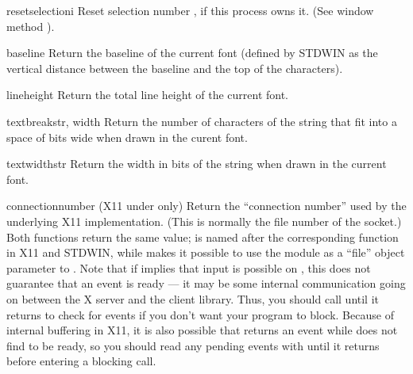 \begin{funcdesc}{resetselection}{i}
Reset selection number , if this process owns it.  (See window
method ).
\end{funcdesc}

\begin{funcdesc}{baseline}{}
Return the baseline of the current font (defined by STDWIN as the
vertical distance between the baseline and the top of the
characters).
\end{funcdesc}

\begin{funcdesc}{lineheight}{}
Return the total line height of the current font.
\end{funcdesc}

\begin{funcdesc}{textbreak}{str, width}
Return the number of characters of the string that fit into a space of
bits wide when drawn in the curent font.
\end{funcdesc}

\begin{funcdesc}{textwidth}{str}
Return the width in bits of the string when drawn in the current font.
\end{funcdesc}

\begin{funcdesc}{connectionnumber}{}
(X11 under \UNIX{} only) Return the ``connection number'' used by the
underlying X11 implementation.  (This is normally the file number of
the socket.)  Both functions return the same value;
 is named after the corresponding function in
X11 and STDWIN, while  makes it possible to use the
 module as a ``file'' object parameter to
.  Note that if  implies that
input is possible on , this does not guarantee that an
event is ready --- it may be some internal communication going on
between the X server and the client library.  Thus, you should call
 until it returns  to check for
events if you don't want your program to block.  Because of internal
buffering in X11, it is also possible that 
returns an event while  does not find  to
be ready, so you should read any pending events with
 until it returns  before entering
a blocking  call.
\end{funcdesc}

